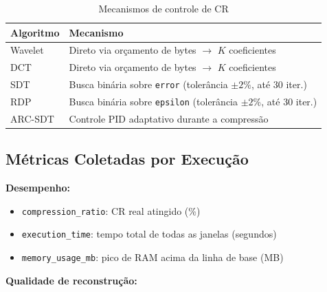 \documentclass[12pt, a4paper]{article}
\begin{document}
\begin{table}[H]
\centering
\caption{Mecanismos de controle de CR}
\begin{tabular}{lp{9cm}}
\toprule
\textbf{Algoritmo} & \textbf{Mecanismo} \\
\midrule
Wavelet  & Direto via orçamento de bytes $\to$ $K$ coeficientes \\
DCT      & Direto via orçamento de bytes $\to$ $K$ coeficientes \\
SDT      & Busca binária sobre \texttt{error} (tolerância $\pm 2\%$, até 30 iter.) \\
RDP      & Busca binária sobre \texttt{epsilon} (tolerância $\pm 2\%$, até 30 iter.) \\
ARC-SDT  & Controle PID adaptativo durante a compressão \\
\bottomrule
\end{tabular}
\end{table}

\subsection{Métricas Coletadas por Execução}

\textbf{Desempenho:}
\begin{itemize}
    \item \texttt{compression\_ratio}: CR real atingido (\%)
    \item \texttt{execution\_time}: tempo total de todas as janelas (segundos)
    \item \texttt{memory\_usage\_mb}: pico de RAM acima da linha de base (MB)
\end{itemize}

\textbf{Qualidade de reconstrução:}
\end{document}
